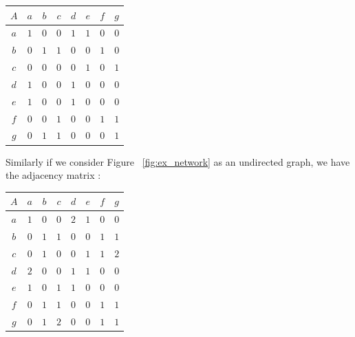\documentclass[a4paper, 12pt, twocolumn]{article}
\begin{document}

\begin{center}
       \begin{tabular}{c|ccccccc}
              $ A $ & $ a $ & $ b $ & $ c $ & $ d $ & $ e $ & $ f $ & $ g $ \\
              \hline
              $ a $ & $ 1 $ & $ 0 $ & $ 0 $ & $ 1 $ & $ 1 $ & $ 0 $ & $ 0 $ \\
              $ b $ & $ 0 $ & $ 1 $ & $ 1 $ & $ 0 $ & $ 0 $ & $ 1 $ & $ 0 $ \\
              $ c $ & $ 0 $ & $ 0 $ & $ 0 $ & $ 0 $ & $ 1 $ & $ 0 $ & $ 1 $ \\
              $ d $ & $ 1 $ & $ 0 $ & $ 0 $ & $ 1 $ & $ 0 $ & $ 0 $ & $ 0 $ \\
              $ e $ & $ 1 $ & $ 0 $ & $ 0 $ & $ 1 $ & $ 0 $ & $ 0 $ & $ 0 $ \\
              $ f $ & $ 0 $ & $ 0 $ & $ 1 $ & $ 0 $ & $ 0 $ & $ 1 $ & $ 1 $ \\
              $ g $ & $ 0 $ & $ 1 $ & $ 1 $ & $ 0 $ & $ 0 $ & $ 0 $ & $ 1 $ \\
       \end{tabular}
\end{center}


\noindent
Similarly if we consider Figure ~\ref{fig:ex_network} as an undirected graph, we have the adjacency matrix :


\begin{center}
       \begin{tabular}{c|ccccccc}
              $ A $ & $ a $ & $ b $ & $ c $ & $ d $ & $ e $ & $ f $ & $ g $ \\
              \hline
              $ a $ & $ 1 $ & $ 0 $ & $ 0 $ & $ 2 $ & $ 1 $ & $ 0 $ & $ 0 $ \\
              $ b $ & $ 0 $ & $ 1 $ & $ 1 $ & $ 0 $ & $ 0 $ & $ 1 $ & $ 1 $ \\
              $ c $ & $ 0 $ & $ 1 $ & $ 0 $ & $ 0 $ & $ 1 $ & $ 1 $ & $ 2 $ \\
              $ d $ & $ 2 $ & $ 0 $ & $ 0 $ & $ 1 $ & $ 1 $ & $ 0 $ & $ 0 $ \\
              $ e $ & $ 1 $ & $ 0 $ & $ 1 $ & $ 1 $ & $ 0 $ & $ 0 $ & $ 0 $ \\
              $ f $ & $ 0 $ & $ 1 $ & $ 1 $ & $ 0 $ & $ 0 $ & $ 1 $ & $ 1 $ \\
              $ g $ & $ 0 $ & $ 1 $ & $ 2 $ & $ 0 $ & $ 0 $ & $ 1 $ & $ 1 $ \\
       \end{tabular}
\end{center}
\end{document}
